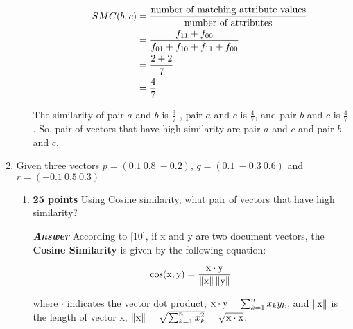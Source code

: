 \documentclass[12pt]{article}%
\begin{document}
\begin{enumerate}
\begin{enumerate}
\begin{enumerate}
			\begin{align*}
				SMC(b,c) & = \frac{\textup{number of matching attribute values}}{\textup{number of attributes}} \\ 
				& = \frac{f_{11}+f_{00}}{f_{01}+f_{10}+f_{11}+f_{00}} \\
				& = \frac{2 + 2}{7} \\
				& = \frac{4}{7}
			\end{align*}

		\end{enumerate}
		\par The similarity of pair $a$ and $b$ is $\frac{3}{7}$ , pair $a$ and $c$ is $\frac{4}{7}$, and pair $b$ and $c$ is $\frac{4}{7}$. So, pair of vectors that have high similarity are pair $a$ and $c$ and pair $b$ and $c$.
	\end{enumerate}

	\item Given three vectors $p = (0.1 \ 0.8 \ -0.2)$, $ q = (0.1 \ -0.3 \ 0.6)$ and $r = (-0.1 \ 0.5 \ 0.3)$
	\begin{enumerate}
		\item \textbf{25 points} Using Cosine similarity, what pair of vectors that have high similarity?
		\par \textbf{\textit{Answer}} According to [10], if x and y are two document vectors, the \textbf{Cosine Similarity} is given by the following equation:

		\begin{equation}
			\cos (\textup{x},\textup{y}) = \frac{\textup{x}\cdot  \textup{y}}{\left \| \textup{x} \right \| \left \| \textup{y} \right \|}
		\end{equation}

		\par where $\cdot$ indicates the vector dot product, $\textup{x} \cdot \textup{y} = \sum_{k=1}^{n} x_k y_k$, and $\left \| \textup{x} \right \|$ is the length of vector x, $\left \| \textup{x} \right \| = \sqrt{\sum_{k=1}^{n}x_{k}^{2}} = \sqrt{\textup{x}\cdot \textup{x}}$.


\end{enumerate}
\end{enumerate}
\end{document}
